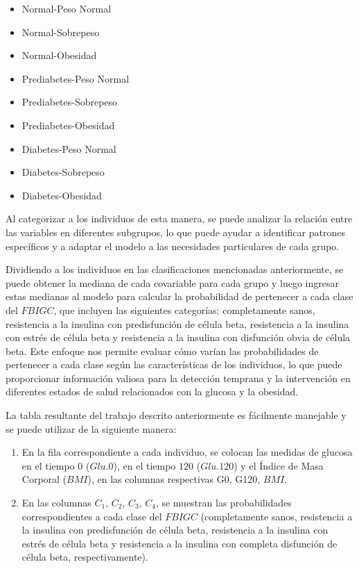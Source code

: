 \begin{multicols}{2}
    \begin{itemize}
        \item Normal-Peso Normal
        \item Normal-Sobrepeso
        \item Normal-Obesidad	
        \item Prediabetes-Peso Normal
        \item Prediabetes-Sobrepeso
        \item Prediabetes-Obesidad	
        \item Diabetes-Peso Normal	
        \item Diabetes-Sobrepeso
        \item Diabetes-Obesidad
    \end{itemize}
\end{multicols}

Al categorizar a los individuos de esta manera, se puede analizar la relación entre las variables en diferentes subgrupos, lo que puede ayudar a identificar patrones específicos y a adaptar el modelo a las necesidades particulares de cada grupo.

Dividiendo a los individuos en las clasificaciones mencionadas anteriormente, se puede obtener la mediana de cada covariable para cada grupo y luego ingresar estas medianas al modelo para calcular la probabilidad de pertenecer a cada clase del $FBIGC$, que incluyen las siguientes categorías: completamente sanos, resistencia a la insulina con predisfunción de célula beta, resistencia a la insulina con estrés de célula beta y resistencia a la insulina con disfunción obvia de célula beta. Este enfoque nos permite evaluar cómo varían las probabilidades de pertenecer a cada clase según las características de los individuos, lo que puede proporcionar información valiosa para la detección temprana y la intervención en diferentes estados de salud relacionados con la glucosa y la obesidad.

La tabla resultante del trabajo descrito anteriormente es fácilmente manejable y se puede utilizar de la siguiente manera:

\begin{enumerate}
    \item En la fila correspondiente a cada individuo, se colocan las medidas de glucosa en el tiempo $0$ ($Glu.0$), en el tiempo $120$ ($Glu.120$) y el Índice de Masa Corporal ($BMI$), en las columnas respectivas G0, G120, $BMI$.

    \item En las columnas $C_1$, $C_2$, $C_3$, $C_4$, se muestran las probabilidades correspondientes a cada clase del $FBIGC$ (completamente sanos, resistencia a la insulina con predisfunción de célula beta, resistencia a la insulina con estrés de célula beta y resistencia a la insulina con completa disfunción de célula beta, respectivamente).
\end{enumerate}

